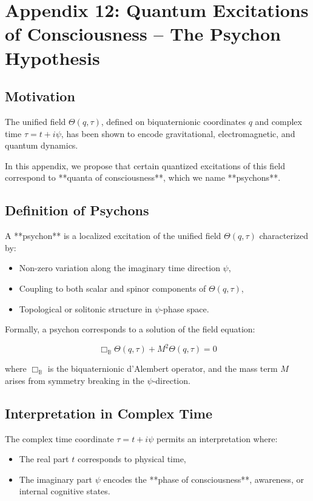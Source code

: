 
\section*{Appendix 12: Quantum Excitations of Consciousness – The Psychon Hypothesis}


\ConsciousnessDisclaimer

\subsection*{Motivation}

The unified field \(\Theta(q, \tau)\), defined on biquaternionic coordinates \(q\) and complex time \(\tau = t + i\psi\),
has been shown to encode gravitational, electromagnetic, and quantum dynamics.

In this appendix, we propose that certain quantized excitations of this field correspond to **quanta of consciousness**,
which we name **psychons**.

\subsection*{Definition of Psychons}

A **psychon** is a localized excitation of the unified field \(\Theta(q, \tau)\) characterized by:
\begin{itemize}
  \item Non-zero variation along the imaginary time direction \(\psi\),
  \item Coupling to both scalar and spinor components of \(\Theta(q, \tau)\),
  \item Topological or solitonic structure in \(\psi\)-phase space.
\end{itemize}

Formally, a psychon corresponds to a solution of the field equation:

\[
\Box_{\mathbb{B}} \Theta(q, \tau) + M^2 \Theta(q, \tau) = 0
\]

where \(\Box_{\mathbb{B}}\) is the biquaternionic d'Alembert operator, and the mass term \(M\) arises from symmetry breaking in the \(\psi\)-direction.

\subsection*{Interpretation in Complex Time}

The complex time coordinate \(\tau = t + i\psi\) permits an interpretation where:
\begin{itemize}
  \item The real part \(t\) corresponds to physical time,
  \item The imaginary part \(\psi\) encodes the **phase of consciousness**, awareness, or internal cognitive states.
\end{itemize}

